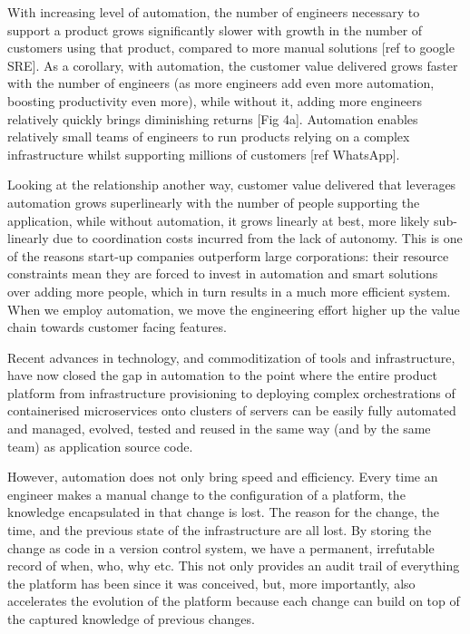 \documentclass[reprint,amsmath,amssymb,aps]{revtex4-1}
\begin{document}
With increasing level of automation, the number of engineers necessary to support a product grows significantly slower with growth in the number of customers using that product, compared to more manual solutions [ref to google SRE]. As a corollary, with automation, the customer value delivered grows faster with the number of engineers (as more engineers add even more automation, boosting productivity even more), while without it, adding more engineers relatively quickly brings diminishing returns [Fig 4a]. Automation enables relatively small teams of engineers to run products relying on a complex infrastructure whilst supporting millions of customers [ref WhatsApp].

Looking at the relationship another way, customer value delivered that leverages automation grows superlinearly with the number of people supporting the application, while without automation, it grows linearly at best, more likely sub-linearly due to coordination costs incurred from the lack of autonomy. This is one of the reasons start-up companies outperform large corporations: their resource constraints mean they are forced to invest in automation and smart solutions over adding more people, which in turn results in a much more efficient system. When we employ automation, we move the engineering effort higher up the value chain towards customer facing features.

Recent advances in technology, and commoditization of tools and infrastructure, have now closed the gap in automation to the point where the entire product platform from infrastructure provisioning to deploying complex orchestrations of containerised microservices onto clusters of servers can be easily fully automated and managed, evolved, tested and reused in the same way (and by the same team) as application source code.

However, automation does not only bring speed and efficiency. Every time an engineer makes a manual change to the configuration of a platform, the knowledge encapsulated in that change is lost. The reason for the change, the time, and the previous state of the infrastructure are all lost. By storing the change as code in a version control system, we have a permanent, irrefutable record of when, who, why etc. This not only provides an audit trail of everything the platform has been since it was conceived, but, more importantly, also accelerates the evolution of the platform because each change can build on top of the captured knowledge of previous changes.
\end{document}
